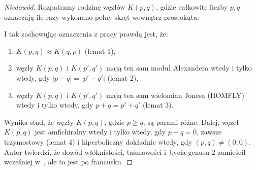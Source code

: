 \begin{proof}[Niedowód]
    Rozpatrzmy rodzinę węzłów $K(p, q)$, gdzie całkowite liczby $p, q$ oznaczają ile razy wykonano pełny skręt wewnątrz prostokąta:
\begin{comment}
    \[
        \begin{tikzpicture}[baseline=-0.65ex,scale=0.08]
        \begin{knot}[clip width=3, flip crossing/.list={1,3,6,7}]
        \strand [semithick] (0, 25)
            [in=left, out=right] to (20, 25)
            [in=up, out=right] to (25, 5)
            [in=down, out=down] to (15, 5)
            [in=right, out=up] to (10, 20)
            [in=up, out=left] to (5, 15)
            [in=up, out=down] to (5, 5)
            [in=left, out=down] to (15, -10)
        ;
        \strand [semithick] (15, -10)
            [in=down, out=right] to (20, 10)
            [in=up, out=up] to (30, 10)
            [in=right, out=down] to (20, -25)
            [in=down, out=left] to (5, -20)
            [in=down, out=up] to (5, -10)
        ;
        \strand [semithick] (5, -10)
            [in=down, out=up] to (15, 0)
            [in=right, out=up] to (0, 5)
            [in=up, out=left] to (-15, 0)
            [in=up, out=down] to (-5, -10)
            ;
        \strand [semithick] (-15, -10)
            [in=down, out=left] to (-20, 10)
            [in=up, out=up] to (-30, 10)
            [in=left, out=down] to (-20, -25)
            [in=down, out=right] to (-5, -20)
            [in=down, out=up] to (-5, -10)
        ;
        \strand [semithick] (0, 25)
            [in=right, out=left] to (-20, 25)
            [in=up, out=left] to (-25, 5)
            [in=down, out=down] to (-15, 5)
            [in=left, out=up] to (-10, 20)
            [in=up, out=right] to (-5, 15)
            [in=up, out=down] to (-5, 5)
            [in=right, out=down] to (-15, -10)
        ;
        \draw[fill=blue!10!white] (-5, 10) rectangle (5, 15);
        \draw[fill=blue!10!white] (-5, -17.5) rectangle (5, -12.5);
        \node at (0, 12.5) {$p$};
        \node at (0, -15) {$q$};
        \end{knot}
        \end{tikzpicture}
    \]
\end{comment}
    I tak zachowując oznaczenia z pracy \cite{kanenobu86} prawdą jest, że:
    \begin{enumerate}
        \item $K(p,q) \approx K(q,p)$ (lemat 1),
        \item węzły $K(p,q)$ i $K(p', q')$ mają ten sam moduł Alexandera wtedy i tylko wtedy, gdy $|p-q| = |p'-q'|$ (lemat 2),
        \item węzły $K(p,q)$ i $K(p', q')$ mają ten sam wielomian Jonesa (HOMFLY) wtedy i tylko wtedy, gdy $p+q = p'+q'$ (lemat 3).
    \end{enumerate}
    Wynika stąd, że węzły $K(p, q)$, gdzie $p \ge q$, są parami różne.
    Dalej, węzeł $K(p,q)$ jest amfichiralny wtedy i tylko wtedy, gdy $p + q = 0$, zawsze trzymostowy (lemat 4) i hiperboliczny dokładnie wtedy, gdy $(p, q) \neq (0, 0)$.
    Autor twierdzi, że dowód włóknistości, taśmowości i~bycia genusu $2$ zamieścił wcześniej w~\cite{kanenobu81}, ale to jest po francusku.
\end{proof}

